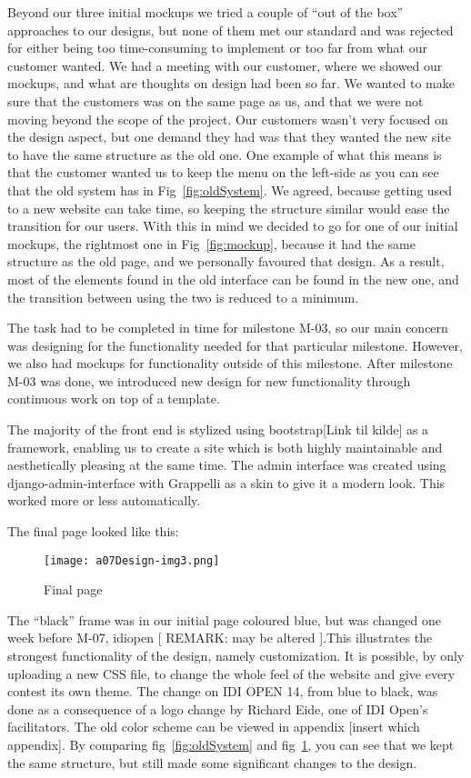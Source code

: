 Beyond our three initial mockups we tried a couple of ``out
of the box'' approaches to our designs, but none of them
met our standard and was rejected for either being too time-consuming
to implement or too far from what our customer wanted. We had a meeting
with our customer, where we showed our mockups, and what are thoughts
on design had been so far. We wanted to make sure that the customers
was on the same page as us, and that we were not moving beyond the
scope of the project. Our customers wasn't very focused
on the design aspect, but one demand they had was that they wanted the
new site to have the same structure as the old one. One example of what
this means is that the customer wanted us to keep the menu on the
left-side as you can see that the old system has in Fig~\ref{fig:oldSystem}. We agreed,
because getting used to a new website can take time, so keeping the
structure similar would ease the transition for our users. With this in
mind we decided to go for one of our initial mockups, the rightmost one
in Fig~\ref{fig:mockup}, because it had the same structure as the old page, and we
personally favoured that design. As a result, most of the elements
found in the old interface can be found in the new one, and the
transition between using the two is reduced to a minimum.

The task had to be completed in time for milestone M-03, so our main
concern was designing for the functionality needed for that particular
milestone. However, we also had mockups for functionality outside of
this milestone. After milestone M-03 was done, we introduced new design
for new functionality through continuous work on top of a template.

The majority of the front end is stylized using bootstrap[Link til
kilde] as a framework, enabling us to create a site which is both
highly maintainable and aesthetically pleasing at the same time. The
admin interface was created using django-admin-interface with Grappelli
as a skin to give it a modern look. This worked more or less
automatically.


The final page looked like this:
 \begin{figure}[h!]
	\texttt{[image: a07Design-img3.png]} 
	\caption{Final page}
	\label{fig:finalUI}
\end{figure}

The ``black'' frame was in our
initial page coloured blue, but was changed one week before M-07,
idiopen [ REMARK: may be altered ].This illustrates the strongest
functionality of the design, namely customization. It is possible, by
only uploading a new CSS file, to change the whole feel of the website
and give every contest its own theme. The change on IDI OPEN 14, from
blue to black, was done as a consequence of a logo change by Richard
Eide, one of IDI Open's facilitators. The old color
scheme can be viewed in appendix [insert which appendix]. By comparing
fig~\ref{fig:oldSystem} and fig~\ref{fig:finalUI}, you can see that we kept the same structure, but
still made some significant changes to the design.


